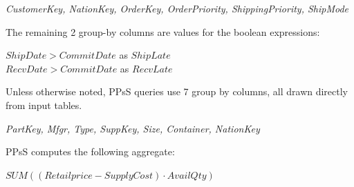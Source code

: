 \noindent\textit{CustomerKey, NationKey, OrderKey, OrderPriority, ShippingPriority, ShipMode}

\noindent The remaining 2 group-by columns are values for the boolean expressions:

{\noindent $ShipDate > CommitDate$ as $ShipLate$\\
$RecvDate > CommitDate$ as $RecvLate$}

Unless otherwise noted, PPsS queries use 7 group by columns, all drawn directly from input tables.  

\noindent\textit{PartKey, Mfgr, Type, SuppKey, Size, Container, NationKey}

PPsS computes the following aggregate:

{\noindent$SUM((Retailprice - SupplyCost) \cdot AvailQty)$}


